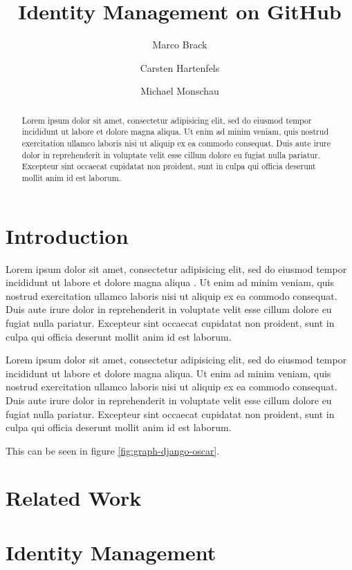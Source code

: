 \documentclass{article}
\begin{document}
\title{Identity Management on GitHub}
\author{Marco Brack \and Carsten Hartenfels \and Michael Monschau}
\maketitle

\begin{abstract}
  Lorem ipsum dolor sit amet, consectetur adipisicing elit, sed do eiusmod tempor incididunt ut labore et dolore magna aliqua. Ut enim ad minim veniam, quis nostrud exercitation ullamco laboris nisi ut aliquip ex ea commodo consequat. Duis aute irure dolor in reprehenderit in voluptate velit esse cillum dolore eu fugiat nulla pariatur. Excepteur sint occaecat cupidatat non proident, sunt in culpa qui officia deserunt mollit anim id est laborum.
\end{abstract}

\section{Introduction}

Lorem ipsum dolor sit amet, consectetur adipisicing elit, sed do eiusmod tempor incididunt ut labore et dolore magna aliqua \cite{goeminne2013comparison}. Ut enim ad minim veniam, quis nostrud exercitation ullamco laboris nisi ut aliquip ex ea commodo consequat. Duis aute irure dolor in reprehenderit in voluptate velit esse cillum dolore eu fugiat nulla pariatur. Excepteur sint occaecat cupidatat non proident, sunt in culpa qui officia deserunt mollit anim id est laborum.

Lorem ipsum dolor sit amet, consectetur adipisicing elit, sed do eiusmod tempor incididunt ut labore et dolore magna aliqua. Ut enim ad minim veniam, quis nostrud exercitation ullamco laboris nisi ut aliquip ex ea commodo consequat. Duis aute irure dolor in reprehenderit in voluptate velit esse cillum dolore eu fugiat nulla pariatur. Excepteur sint occaecat cupidatat non proident, sunt in culpa qui officia deserunt mollit anim id est laborum.

This can be seen in figure \ref{fig:graph-django-oscar}.

\section{Related Work}
\section{Identity Management}
\end{document}
